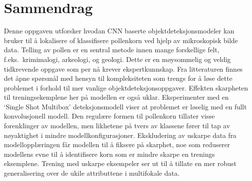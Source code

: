 
\chapter*{Sammendrag}
Denne oppgaven utforsker hvodan CNN baserte objektdeteksjonsmodeler kan bruker til å lokalisere of klassifisere pollenkorn ved hjelp av mikroskopisk bilde data.
Telling av pollen er en sentral metode innen mange forskellige felt, f.eks.\ krimimalogi, arkeologi, og geologi.
Dette er en møysommelig og veldig tidkrevende oppgave som per nå krever ekspertkunnskap.
Fra litteraturen finnes det åpne spørsmål med hensyn til kompleksiteten som trengs for å løse dette problemet i forhold til mer vanlige objektdeteksjonsoppgaver.
Effekten skarpheten til treningsekemplene her på modellen er også uklar.
Eksperimenter med en `Single Shot Multibox' deteksjonsmodell viser at problemet er løselig med en fullt konvolusjonell modell.
Den regulære formen til pollenkorn tillater visse forenklinger av modellen, men likhetene på tvers av klassene fører til tap av nøyaktighet i mindre modellkonfigurasjoner.
Ekskludering av uskarpe data fra modellopplæringen får modellen til å fiksere på skarphet, noe som reduserer modellens evne til å identifisere korn som er mindre skarpe en trenings eksemplene.
Trening med uskarpe eksempeler ser ut til å tillate en mer robust generalisering over de ukile attributtene i multifokale data.